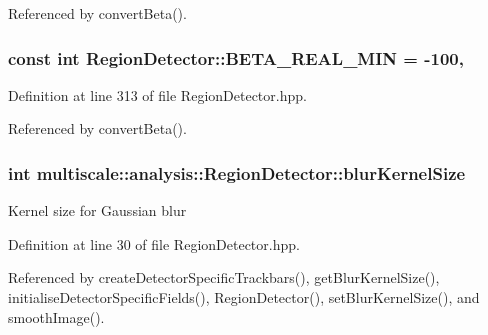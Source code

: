 Referenced by convert\-Beta().

\hypertarget{classmultiscale_1_1analysis_1_1RegionDetector_a87d07b8a993b50bcf050e4c206ac126c}{
\subsubsection[{B\-E\-T\-A\-\_\-\-R\-E\-A\-L\-\_\-\-M\-I\-N}]{\setlength{\rightskip}{0pt plus 5cm}const int Region\-Detector\-::\-B\-E\-T\-A\-\_\-\-R\-E\-A\-L\-\_\-\-M\-I\-N = -\/100\hspace{0.3cm}{\ttfamily [static]}, {\ttfamily [private]}}}\label{classmultiscale_1_1analysis_1_1RegionDetector_a87d07b8a993b50bcf050e4c206ac126c}


Definition at line 313 of file Region\-Detector.\-hpp.



Referenced by convert\-Beta().

\hypertarget{classmultiscale_1_1analysis_1_1RegionDetector_aae6ee0ec7f0a610dd8a906c1eb181bc7}{
\subsubsection[{blur\-Kernel\-Size}]{\setlength{\rightskip}{0pt plus 5cm}int multiscale\-::analysis\-::\-Region\-Detector\-::blur\-Kernel\-Size\hspace{0.3cm}{\ttfamily [private]}}}\label{classmultiscale_1_1analysis_1_1RegionDetector_aae6ee0ec7f0a610dd8a906c1eb181bc7}
Kernel size for Gaussian blur 

Definition at line 30 of file Region\-Detector.\-hpp.



Referenced by create\-Detector\-Specific\-Trackbars(), get\-Blur\-Kernel\-Size(), initialise\-Detector\-Specific\-Fields(), Region\-Detector(), set\-Blur\-Kernel\-Size(), and smooth\-Image().

